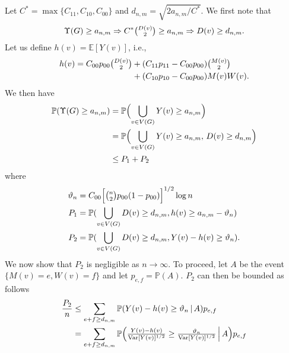 \documentclass[10pt,journal,compsoc]{IEEEtran}
\theoremstyle{definition}
\begin{document}
\begin{IEEEproof}[Lemma~8]
\begin{IEEEproof}[Eq.~\eqref{eq:27}]
 Let $C^{*} = \max\{C_{11},
C_{10}, C_{00}\}$ and $d_{n,m} = \sqrt{2 a_{n,m}/C^{*}}$. We first
note that
\begin{equation*}
\Upsilon(G) \geq a_{n,m} \Rightarrow C^{*} \tbinom{D(v)}{2} \geq
a_{n,m} \Rightarrow D(v) \geq d_{n,m}.
\end{equation*}
Let us define $h(v) = \mathbb{E}[Y(v)]$, i.e., 
\begin{equation*}
  \begin{split}
  h(v) = C_{00}p_{00} \tbinom{D(v)}{2} &+ (C_{11} p_{11} - C_{00}
  p_{00}) \tbinom{M(v)}{2} \\ &+ (C_{10} p_{10} - C_{00} p_{00}) M(v)
  W(v).
  \end{split}
\end{equation*}
We then have
  \begin{equation*}
    \label{eq:31}
    \begin{split}
    \mathbb{P}(\Upsilon(G) \geq a_{n,m}) &= \mathbb{P}\Bigl( \bigcup_{v
      \in V(G)} Y(v) \geq a_{n,m}\Bigr) \\
    &= \mathbb{P}\Bigl( \bigcup_{v
      \in V(G)} Y(v) \geq a_{n,m}, \, D(v) \geq d_{n,m} \Bigr) \\
    &\leq P_1 + P_2
    \end{split}
  \end{equation*}
  where 
  \begin{align*}
    \vartheta_n &= C_{00} \Bigl[ \tbinom{n}{2} p_{00} (1 -
    p_{00})\Bigr]^{1/2} \log{n} \\
    P_1 &= \mathbb{P}(\bigcup_{v \in V(G)} D(v) \geq d_{n,m}, h(v) \geq
    a_{n,m} - \vartheta_n) \\
    P_2 &= \mathbb{P}(\bigcup_{v \in V(G)} D(v) \geq d_{n,m},
    Y(v) - h(v) \geq \vartheta_n).
  \end{align*}
  We now show that $P_2$ is negligible as $n \rightarrow \infty$. To
  proceed, let $A$ be the event $\{M(v) = e, W(v) = f\}$ and let
  $p_{e,f} = \mathbb{P}(A)$. $P_2$ can then be bounded as follows
\begin{equation*}
  \begin{split}
    \frac{P_2}{n} & \leq \sum_{e + f \geq
        d_{n,m}}{\mathbb{P}( Y(v) - h(v) \geq
      \vartheta_{n} \, | \, A)} p_{e,f}  \\
  &=  \sum_{e + f \geq d_{n,m}}{\mathbb{P}\Bigl(
    \tfrac{Y(v) - h(v)}{\mathrm{Var}[Y(v)]^{1/2}} \geq
    \tfrac{\vartheta_n}{\mathrm{Var}[Y(v)]^{1/2}} \, \Bigl| \, A\Bigr) p_{e,f}} \\

\end{split}
\end{equation*}
\end{IEEEproof}
\end{IEEEproof}
\end{document}
